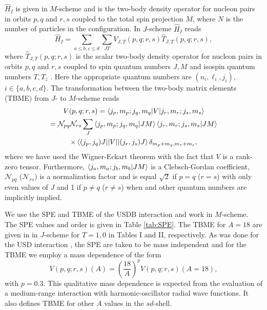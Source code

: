 $\hat H_I$ is given in $M$-scheme and is the two-body density operator for nucleon pairs in orbits $p,q$ and $r,s$ coupled to the total spin projection $M$, where $N$ is the number of particles in the configuration. In $J$-scheme $\hat H_I$ reads 
\begin{equation}
	\hat H_I =  \sum_{a\leq b,c \leq d} \sum_{JT} V_{J,T}(p,q;r,s) \hat T_{J,T}(p,q;r,s),
\end{equation}
where $\hat T_{J,T}(p,q;r,s)$ is the scalar two-body density operator for nucleon pairs in orbits $p,q$ and $r,s$ coupled to spin quantum numbers $J,M$ and isospin quantum numbers $T,T_z$ \cite{Brown2006}. Here the appropriate quantum numbers are $(n_i,\ell_i,j_i)$, $i \in \{a,b,c,d\}$. The transformation between the two-body matrix elements (TBME) from $J$- to $M$-scheme reads
\begin{multline}
	V(p,q;r,s)  =  \braket{j_{p},m_{p};j_{q},m_{q}|V|j_{r},m_{r};j_{s},m_{s}} \\ 
			    =  \mathcal{N}_{pq} \mathcal{N}_{rs} \sum_{J} \braket{j_{p},m_{p};j_{q},m_{q}|JM} \braket{j_{r},m_{r};j_{s},m_{s}|JM} \\
			   	\times \braket{(j_{p},j_{q})J||V||(j_{r},j_{s})J} \delta_{m_p+m_q,m_r+m_s},
\end{multline}
where we have used the Wigner-Eckart theorem with the fact that $ V $ is a rank-zero tensor. Furthermore, $\braket{j_{a},m_{a};j_{b},m_{b}|JM}$ is a Clebsch-Gordan coefficient, $ \mathcal{N}_{pq} $ ($ \mathcal{N}_{rs} $) is a normalization factor and is equal $ \sqrt{2} $ if $ p=q $ ($ r=s $) with only even values of $ J $ and 1 if $ p \not=q $ ($ r \not=s $) when and other quantum numbers are implicitly implied.

We use the SPE and TBME of the USDB interaction \cite{Brown2006} and work in $M$-scheme. The SPE values and order is given in Table \ref{tab:SPE}. The TBME for $A=18$ are given in \cite{Brown2006} in $J$-scheme for $T=1,0$ in Tables I and II, respectively. As was done for the USD interaction \cite{Wildenthal1984}, the SPE are taken to be mass independent and for the TBME we employ a mass dependence of the form
\begin{equation}
	V(p,q;r,s)(A) = \left( \frac{18}{A} \right)^p V(p,q;r,s)(A=18),
\end{equation}
with $p=0.3$. This qualitative mass dependence is expected from the evaluation of a medium-range interaction with harmonic-oscillator radial wave functions. It also defines TBME for other $A$ values in the $sd$-shell.

